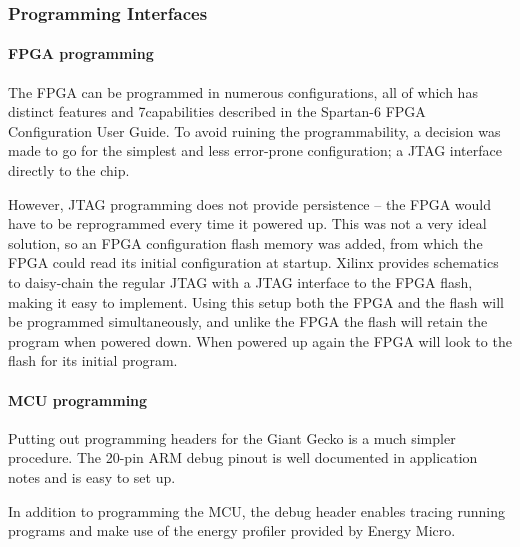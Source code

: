 
\subsubsection{Programming Interfaces}

\paragraph{FPGA programming}
The FPGA can be programmed in numerous configurations, all of which has distinct
features and 7capabilities described in the Spartan-6 FPGA Configuration User
Guide. To avoid ruining the programmability, a decision was made to go for the
simplest and less error-prone configuration; a JTAG interface directly to the
chip.

However, JTAG programming does not provide persistence -- the FPGA would have to
be reprogrammed every time it powered up. This was not a very ideal solution, so
an FPGA configuration flash memory was added, from which the FPGA could read its
initial configuration at startup. Xilinx provides schematics to daisy-chain the
regular JTAG with a JTAG interface to the FPGA flash, making it easy to
implement. Using this setup both the FPGA and the flash will be programmed
simultaneously, and unlike the FPGA the flash will retain the program when
powered down. When powered up again the FPGA will look to the flash for its
initial program.

\paragraph{MCU programming}
Putting out programming headers for the Giant Gecko is a much simpler procedure.
The 20-pin ARM debug pinout is well documented in application notes and is easy
to set up.

In addition to programming the MCU, the debug header enables tracing running
programs and make use of the energy profiler provided by Energy Micro.
